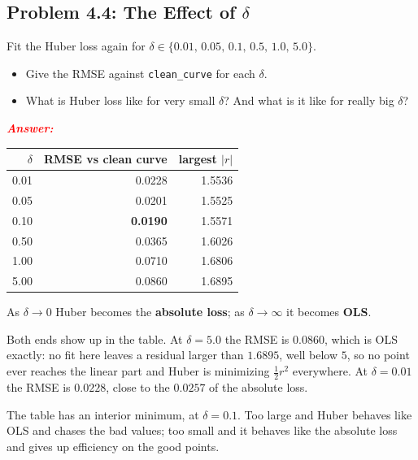 \documentclass[11pt, letterpaper]{article}
\newcommand{\subproblem}[1]{\subsection*{Problem #1}}
\newcommand{\answer}{\textbf{\textit{\textcolor{red}{Answer:}}}}
\begin{document}
\subproblem{4.4: The Effect of $\delta$}
Fit the Huber loss again for $\delta \in \{0.01,\, 0.05,\, 0.1,\, 0.5,\, 1.0,\, 5.0\}$.
\begin{itemize}
    \item Give the RMSE against \texttt{clean\_curve} for each $\delta$.
    \item What is Huber loss like for very small $\delta$? And what is it like for really big $\delta$?
\end{itemize}

\answer

\begin{center}
\begin{tabular}{rrr}
\toprule
$\delta$ & RMSE vs clean curve & largest $|r|$ \\
\midrule
0.01 & 0.0228 & 1.5536 \\
0.05 & 0.0201 & 1.5525 \\
0.10 & \textbf{0.0190} & 1.5571 \\
0.50 & 0.0365 & 1.6026 \\
1.00 & 0.0710 & 1.6806 \\
5.00 & 0.0860 & 1.6895 \\
\bottomrule
\end{tabular}
\end{center}

As $\delta \to 0$ Huber becomes the \textbf{absolute loss}; as $\delta \to \infty$ it becomes
\textbf{OLS}.

Both ends show up in the table. At $\delta = 5.0$ the RMSE is $0.0860$, which is OLS exactly: no fit
here leaves a residual larger than $1.6895$, well below $5$, so no point ever reaches the linear part
and Huber is minimizing $\tfrac{1}{2} r^2$ everywhere. At $\delta = 0.01$ the RMSE is $0.0228$,
close to the $0.0257$ of the absolute loss.

The table has an interior minimum, at $\delta = 0.1$. Too large and Huber behaves like OLS and
chases the bad values; too small and it behaves like the absolute loss and gives up efficiency on
the good points.
\end{document}

